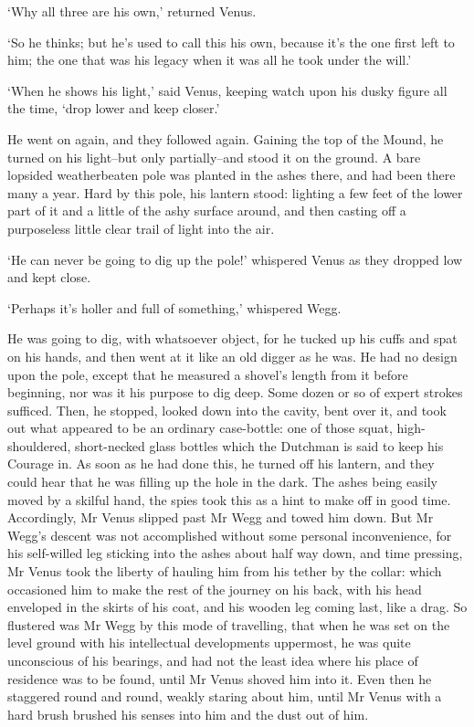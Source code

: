 ‘Why all three are his own,’ returned Venus.

‘So he thinks; but he’s used to call this his own, because it’s the one
first left to him; the one that was his legacy when it was all he took
under the will.’

‘When he shows his light,’ said Venus, keeping watch upon his dusky
figure all the time, ‘drop lower and keep closer.’

He went on again, and they followed again. Gaining the top of the Mound,
he turned on his light--but only partially--and stood it on the ground.
A bare lopsided weatherbeaten pole was planted in the ashes there,
and had been there many a year. Hard by this pole, his lantern stood:
lighting a few feet of the lower part of it and a little of the ashy
surface around, and then casting off a purposeless little clear trail of
light into the air.

‘He can never be going to dig up the pole!’ whispered Venus as they
dropped low and kept close.

‘Perhaps it’s holler and full of something,’ whispered Wegg.

He was going to dig, with whatsoever object, for he tucked up his cuffs
and spat on his hands, and then went at it like an old digger as he
was. He had no design upon the pole, except that he measured a shovel’s
length from it before beginning, nor was it his purpose to dig deep.
Some dozen or so of expert strokes sufficed. Then, he stopped, looked
down into the cavity, bent over it, and took out what appeared to be an
ordinary case-bottle: one of those squat, high-shouldered, short-necked
glass bottles which the Dutchman is said to keep his Courage in. As soon
as he had done this, he turned off his lantern, and they could hear that
he was filling up the hole in the dark. The ashes being easily moved by
a skilful hand, the spies took this as a hint to make off in good time.
Accordingly, Mr Venus slipped past Mr Wegg and towed him down. But Mr
Wegg’s descent was not accomplished without some personal inconvenience,
for his self-willed leg sticking into the ashes about half way down, and
time pressing, Mr Venus took the liberty of hauling him from his tether
by the collar: which occasioned him to make the rest of the journey on
his back, with his head enveloped in the skirts of his coat, and his
wooden leg coming last, like a drag. So flustered was Mr Wegg by this
mode of travelling, that when he was set on the level ground with his
intellectual developments uppermost, he was quite unconscious of his
bearings, and had not the least idea where his place of residence was
to be found, until Mr Venus shoved him into it. Even then he staggered
round and round, weakly staring about him, until Mr Venus with a hard
brush brushed his senses into him and the dust out of him.

